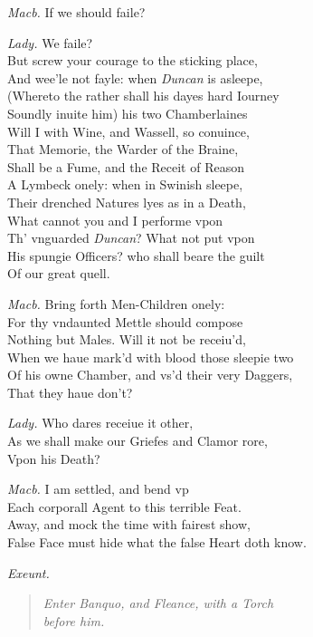 \documentclass[12pt]{sides}
\newcommand{\StageDir}[1]{\begin{quote}\centering\em #1\end{quote}}
\newcommand{\dia}[1]{\hskip 15pt\textit{#1}\hskip 6pt}
\begin{document}
\begin{multicols}{2}
            \dia{Macb.} If we should faile?

            \dia{Lady.} We faile? \\ But screw your courage to the sticking place, \\ And wee'le not fayle: when \textit{Duncan} is asleepe, \\ (Whereto the rather shall his dayes hard Iourney \\ Soundly inuite him) his two Chamberlaines \\ Will I with Wine, and Wassell, so conuince, \\ That Memorie, the Warder of the Braine, \\ Shall be a Fume, and the Receit of Reason \\ A Lymbeck onely: when in Swinish sleepe, \\ Their drenched Natures lyes as in a Death, \\ What cannot you and I performe vpon \\ Th' vnguarded \textit{Duncan}? What not put vpon \\ His spungie Officers? who shall beare the guilt \\ Of our great quell.

            \dia{Macb.} Bring forth Men-Children onely: \\ For thy vndaunted Mettle should compose \\ Nothing but Males. Will it not be receiu'd, \\ When we haue mark'd with blood those sleepie two \\ Of his owne Chamber, and vs'd their very Daggers, \\ That they haue don't?

            \dia{Lady.} Who dares receiue it other, \\ As we shall make our Griefes and Clamor rore, \\ Vpon his Death?

            \dia{Macb.} I am settled, and bend vp \\ Each corporall Agent to this terrible Feat. \\ Away, and mock the time with fairest show, \\ False Face must hide what the false Heart doth know.
            
            \hfill\textit{Exeunt.}\hspace{48pt} %
            \StageDir{Enter Banquo, and Fleance, with a Torch \\ before him.}

	\end{multicols}
\end{document}
